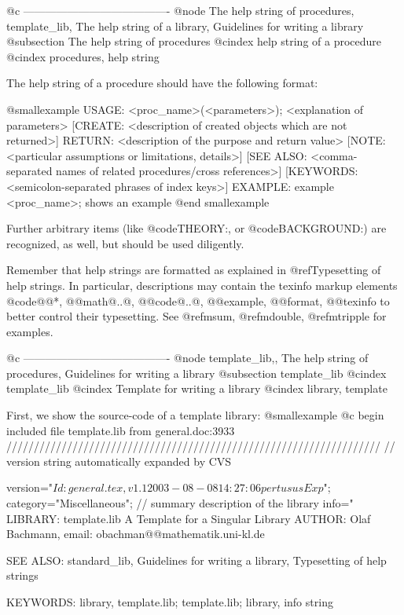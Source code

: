 {{{{@c ----------------------------------------
@node The help string of procedures, template_lib, The help string of a library, Guidelines for writing a library
@subsection The help string of procedures
@cindex help string of a procedure
@cindex procedures, help string

The help string of a procedure should have the following format:

@smallexample
USAGE:    <proc_name>(<parameters>);   <explanation of parameters>
[CREATE:  <description of created objects which are not returned>]
RETURN:   <description of the purpose and return value>
[NOTE:    <particular assumptions or limitations, details>]
[SEE ALSO: <comma-separated names of related procedures/cross references>]
[KEYWORDS: <semicolon-separated phrases of index keys>]
EXAMPLE:  example <proc_name>; shows an example
@end smallexample

Further arbitrary items (like @code{THEORY:}, or @code{BACKGROUND:}) are
recognized, as well, but should be used diligently.

Remember that help strings are formatted as explained in
@ref{Typesetting of help strings}. In particular, descriptions may
contain the texinfo markup elements @code{@@*, @@math@{..@},
@@code@{..@}, @@example, @@format, @@texinfo} to better control their
typesetting. See @ref{msum}, @ref{mdouble}, @ref{mtripple} for examples.

@c ----------------------------------------
@node template_lib,, The help string of procedures, Guidelines for writing a library
@subsection template_lib
@cindex template_lib
@cindex Template for writing a library
@cindex library, template

First, we show the source-code of a template library:
@smallexample
@c begin included file template.lib from general.doc:3933
////////////////////////////////////////////////////////////////////
// version string automatically expanded by CVS

version="$Id: general.tex,v 1.1 2003-08-08 14:27:06 pertusus Exp $";
category="Miscellaneous";
// summary description of the library
info="
LIBRARY:   template.lib  A Template for a Singular Library
AUTHOR:    Olaf Bachmann, email: obachman@@mathematik.uni-kl.de

SEE ALSO:  standard_lib, Guidelines for writing a library,
           Typesetting of help strings

KEYWORDS: library, template.lib; template.lib; library, info string

}}}}
